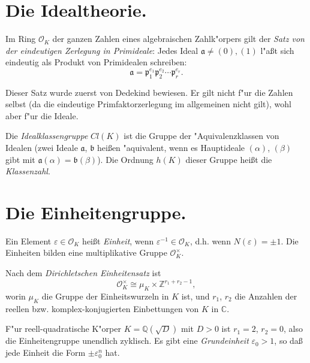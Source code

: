 \documentclass[12pt,a4paper]{article}
\theoremstyle{definition}
\begin{document}
\newpage

\section{Die Idealtheorie.}

Im Ring $\mathcal{O}_K$ der ganzen Zahlen eines algebraischen Zahlk"orpers gilt der \emph{Satz von der eindeutigen Zerlegung in Primideale}: Jedes Ideal $\mathfrak{a} \neq (0), (1)$ l"a\ss{}t sich eindeutig als Produkt von Primidealen schreiben:
\begin{equation}\tag{1}
\mathfrak{a} = \mathfrak{p}_1^{e_1}\mathfrak{p}_2^{e_2}\cdots\mathfrak{p}_r^{e_r}.
\end{equation}

Dieser Satz wurde zuerst von Dedekind bewiesen. Er gilt nicht f"ur die Zahlen selbst (da die eindeutige Primfaktorzerlegung im allgemeinen nicht gilt), wohl aber f"ur die Ideale.

Die \emph{Idealklassengruppe} $Cl(K)$ ist die Gruppe der "Aquivalenzklassen von Idealen (zwei Ideale $\mathfrak{a}$, $\mathfrak{b}$ hei\ss{}en "aquivalent, wenn es Hauptideale $(\alpha)$, $(\beta)$ gibt mit $\mathfrak{a}(\alpha) = \mathfrak{b}(\beta)$). Die Ordnung $h(K)$ dieser Gruppe hei\ss{}t die \emph{Klassenzahl}.

\newpage

\section{Die Einheitengruppe.}

Ein Element $\varepsilon \in \mathcal{O}_K$ hei\ss{}t \emph{Einheit}, wenn $\varepsilon^{-1} \in \mathcal{O}_K$, d.h. wenn $N(\varepsilon) = \pm 1$. Die Einheiten bilden eine multiplikative Gruppe $\mathcal{O}_K^\times$.

Nach dem \emph{Dirichletschen Einheitensatz} ist
\begin{equation}\tag{1}
\mathcal{O}_K^\times \cong \mu_K \times \mathbb{Z}^{r_1 + r_2 - 1},
\end{equation}
worin $\mu_K$ die Gruppe der Einheitswurzeln in $K$ ist, und $r_1$, $r_2$ die Anzahlen der reellen bzw. komplex-konjugierten Einbettungen von $K$ in $\mathbb{C}$.

F"ur reell-quadratische K"orper $K = \mathbb{Q}(\sqrt{D})$ mit $D > 0$ ist $r_1 = 2$, $r_2 = 0$, also die Einheitengruppe unendlich zyklisch. Es gibt eine \emph{Grundeinheit} $\varepsilon_0 > 1$, so da\ss{}{} jede Einheit die Form $\pm\varepsilon_0^n$ hat.
\end{document}
